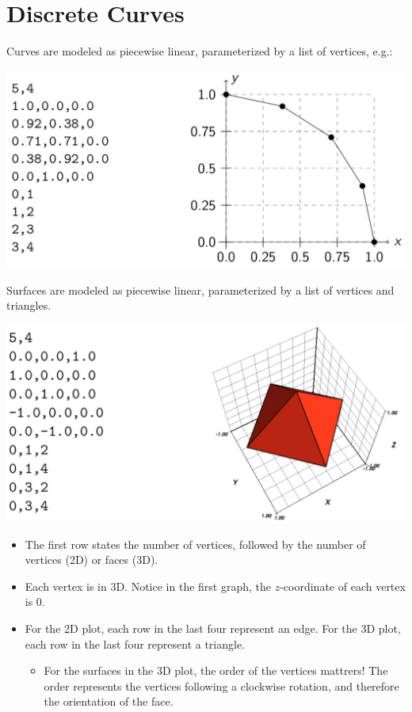 \documentclass[10pt]{article}
\begin{document}
\section*{Discrete Curves}
Curves are modeled as piecewise linear, parameterized by a list of vertices, e.g.:
\begin{center}
    \includegraphics*[scale=0.4]{W3_2.png}
\end{center}
Surfaces are modeled as piecewise linear, parameterized by a list of vertices and triangles.
\begin{center}
    \includegraphics*[scale=0.4]{W3_3.png}
\end{center}
\begin{itemize}
    \item The first row states the number of vertices, followed by the number of vertices (2D) or faces (3D).
    \item Each vertex is in 3D.  Notice in the first graph, the $z$-coordinate of each vertex is 0.
    \item For the 2D plot, each row in the last four represent an edge.  For the 3D plot, each row in the last four represent a triangle.
    \begin{itemize}
        \item For the surfaces in the 3D plot, the order of the vertices mattrers!  The order represents the vertices following a clockwise rotation, and therefore the orientation of the face.
    \end{itemize}
\end{itemize}
\end{document}
